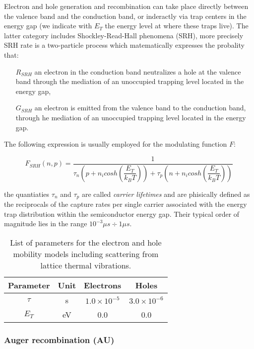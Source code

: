 Electron and hole generation and recombination can take place directly between the valence band and the conduction band, or inderactly via trap centers in the energy gap (we indicate with $E_T$ the energy level at where these traps live). The latter category includes Shockley-Read-Hall phenomena (SRH), more precisely SRH rate is a two-particle process which matematically expresses the probality that:
\begin{itemize}
\item[$R_{SRH}$] an electron in the conduction band neutralizes a hole at the valence band through the mediation of an unoccupied trapping level located in the energy gap,
\item[$G_{SRH}$] an electron is emitted from the valence band to the conduction band, through he mediation of an unoccupied trapping level located in the energy gap.
\end{itemize}

The following expression is usually employed for the modulating function $F$:

\begin{equation}
F_{SRH}(n,p) = \dfrac{1}{\tau_n\left(p+n_i cosh\left(\dfrac{E_T}{k_BT} \right) \right)+\tau_p\left(n+n_i cosh\left(\dfrac{E_T}{k_BT}\right) \right)}
\end{equation}

the quantiaties $\tau_n$ and $\tau_p$ are called \textit{carrier lifetimes} and are phisically defined as the reciprocals of the capture rates per single carrier associated with the energy trap distribution within the semiconductor energy gap. Their typical order of magnitude lies in the range $10^{-3}\mu s\div 1 \mu s$.

\begin{table}[!h]
\centering
\begin{tabular}{cccc}
\toprule
Parameter & Unit & Electrons & Holes \\
\midrule
$\tau$ & s & $1.0\times 10^{-5}$ & $3.0 \times 10^{-6}$\\
$E_T$ & eV & 0.0 & 0.0\\
\bottomrule
\end{tabular}
\caption{List of parameters for the electron and hole mobility models including scattering from lattice thermal vibrations.}
\end{table}

\subsubsection{Auger recombination (AU)}

